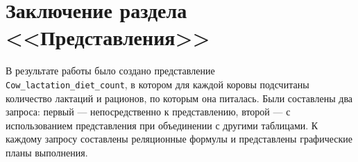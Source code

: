\section*{Заключение раздела <<Представления>>}

В результате работы было создано представление \\\texttt{Cow\_lactation\_diet\_count},
в котором для каждой коровы подсчитаны количество лактаций и рационов, по которым
она питалась. Были составлены два запроса: первый --- непосредственно к представлению,
второй --- с использованием представления при объединении с другими таблицами.
К каждому запросу составлены реляционные формулы и представлены графические планы
выполнения.